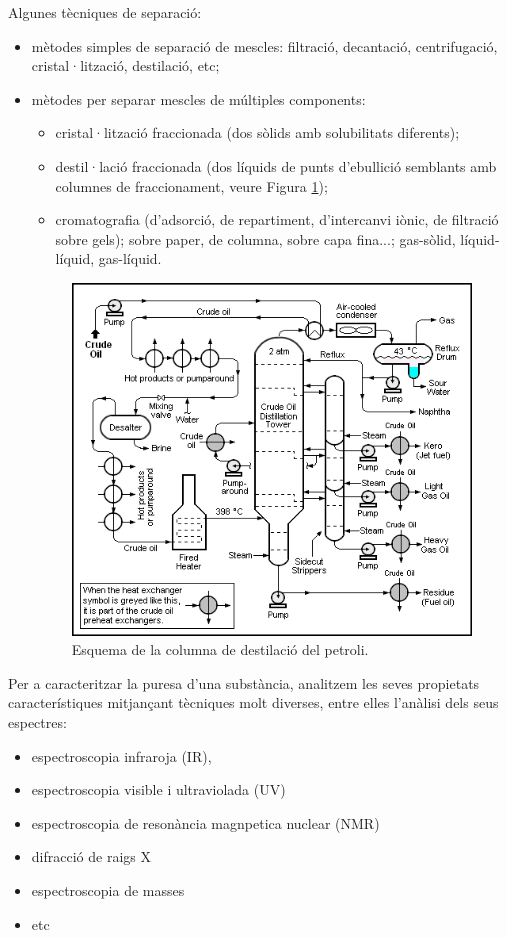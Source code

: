 Algunes tècniques de separació:
\begin{itemize}
\item mètodes simples de separació de mescles: filtració, decantació, centrifugació, cristal·lització, destilació, etc;
\item mètodes per separar mescles de múltiples components: 
\begin{itemize}
\item cristal·lització fraccionada (dos sòlids amb solubilitats diferents);
\item destil·lació fraccionada (dos líquids de punts d'ebullició semblants amb columnes de fraccionament, veure Figura \ref{fig:Crude_Oil_Distillation_Unit});
\item cromatografia (d'adsorció, de repartiment, d'intercanvi iònic, de filtració sobre gels); sobre paper, de columna, sobre capa fina...; gas-sòlid, líquid-líquid, gas-líquid.
\end{itemize}  
\begin{figure}[h]
\centering
\includegraphics[scale=0.8]{figures/Crude_Oil_Distillation_Unit.png}
\caption{Esquema de la columna de destilació del petroli.}
\label{fig:Crude_Oil_Distillation_Unit}
\end{figure}
\end{itemize}

Per a caracteritzar la puresa d'una substància, analitzem les seves propietats característiques mitjançant tècniques molt diverses, entre elles l'anàlisi dels seus espectres:
\begin{itemize}
\item espectroscopia infraroja (IR), 
\item espectroscopia visible i ultraviolada (UV)
\item espectroscopia de resonància magnpetica nuclear (NMR)
\item difracció de raigs X
\item espectroscopia de masses
\item etc
\end{itemize}

